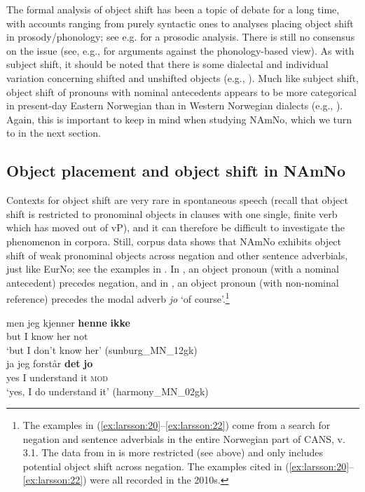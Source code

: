 \documentclass[output=paper]{langscibook}
\begin{document}
The formal analysis of object shift has been a topic of debate for a long time, with accounts ranging from purely syntactic ones to analyses placing object shift in prosody/phonology; see e.g. \citet{Erteschik-ShirEtAl2021} for a prosodic analysis. There is still no consensus on the issue (see, e.g., \citealt{LyskawaEtAl2022} for arguments against the phonology-based view). As with subject shift, it should be noted that there is some dialectal and individual variation concerning shifted and unshifted objects (e.g., \citealt{LundquistTengesdal2022}). Much like subject shift, object shift of pronouns with nominal antecedents appears to be more categorical in present-day Eastern Norwegian than in Western Norwegian dialects (e.g., \citealt{OestboeMunch2013, Bentzen2014b}). Again, this is important to keep in mind when studying NAmNo, which we turn to in the next section. 

\subsection{Object placement and object shift in NAmNo}\label{sec:larsson:4.2}

Contexts for object shift are very rare in spontaneous speech (recall that object shift is restricted to pronominal objects in clauses with one single, finite verb which has moved out of vP), and it can therefore be difficult to investigate the phenomenon in corpora. Still, corpus data shows that NAmNo exhibits object shift of weak pronominal objects across negation and other sentence adverbials, just like EurNo; see the examples in . In , an object pronoun (with a nominal antecedent) precedes negation, and in , an object pronoun (with non-nominal reference) precedes the modal adverb \textit{jo} ‘of course’.\footnote{The examples in (\ref{ex:larsson:20}--\ref{ex:larsson:22}) come from a search for negation and sentence adverbials in the entire Norwegian part of CANS, v. 3.1. The data from \citet{LarssonForthcoming} in  is more restricted (see  above) and only includes potential object shift across negation.  The examples cited in (\ref{ex:larsson:20}--\ref{ex:larsson:22}) were all recorded in the 2010s. }  

\ea%
    \label{ex:larsson:20}
    \ea 
    \gll men jeg kjenner \textbf{henne} \textbf{ikke}  \\
         but I know her not \\
    \glt ‘but I don't know her’ (sunburg\_MN\_12gk)\label{ex:larsson:20a}\\
    \ex 
    \gll ja jeg forstår \textbf{det} \textbf{jo}\\
         yes I understand it \textsc{mod}\\
    \glt ‘yes, I do understand it’ (harmony\_MN\_02gk)\label{ex:larsson:20b}\\
    \z %
\z
\end{document}
